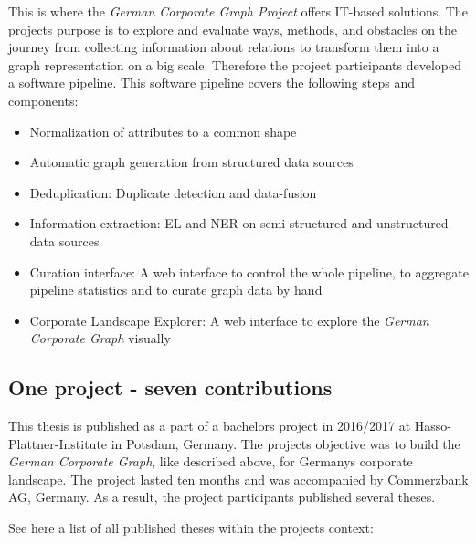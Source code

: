This is where the \emph{German Corporate Graph Project} offers IT-based solutions. The project\grq s purpose is to explore and evaluate ways, methods, and obstacles on the journey from collecting information about relations to transform them into a graph representation on a big scale. Therefore the project participants developed a software pipeline. 
\newpage
This software pipeline covers the following steps and components:
\begin{itemize}
\item Normalization of attributes to a common shape
\item Automatic graph generation from structured data sources
\item Deduplication: Duplicate detection and data-fusion 
\item Information extraction: EL and NER on semi-structured and unstructured data sources
\item Curation interface: A web interface to control the whole pipeline, to aggregate pipeline statistics and to curate graph data by hand
\item Corporate Landscape Explorer: A web interface to explore the \emph{German Corporate Graph} visually   
\end{itemize}


\subsection{One project - seven contributions}

This thesis is published as a part of a bachelor\grq s project in 2016/2017 at Hasso-Plattner-Institute in Potsdam, Germany. The project\grq s objective was to build the \emph {German Corporate Graph}, like described above, for Germany\grq s corporate landscape. The project lasted ten months and was accompanied by Commerzbank AG, Germany. As a result, the project participants published several theses. 



See here a list of all published theses within the project\grq s context:

